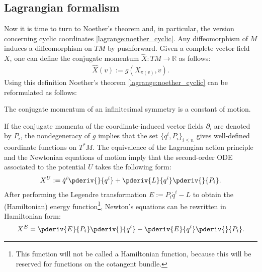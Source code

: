 \subsection{Lagrangian formalism}

    Now it is time to turn to Noether's theorem and, in particular, the version concerning cyclic coordinates \ref{lagrange:noether_cyclic}. Any diffeomorphism of $M$ induces a diffeomorphism on $TM$ by pushforward.
    Given a complete vector field $X$, one can define the conjugate momentum $\widehat{X}:TM\rightarrow\mathbb{R}$ as follows:
    \begin{gather}
        \label{lagrange:metric_conjugate_momentum}
        \widehat{X}(v) := g(X_{\pi(v)},v).
    \end{gather}
    Using this definition Noether's theorem \ref{lagrange:noether_cyclic} can be reformulated as follows:
    \begin{theorem}
        The conjugate momentum of an infinitesimal symmetry is a constant of motion.
    \end{theorem}

    If the conjugate momenta of the coordinate-induced vector fields $\partial_i$ are denoted by $P_i$, the nondegeneracy of $g$ implies that the set $\{q^i,P_i\}_{i\leq n}$ gives well-defined coordinate functions on $T^*M$. The equivalence of the Lagrangian action principle and the Newtonian equations of motion imply that the second-order ODE associated to the potential $U$ takes the following form:
    \begin{gather}
        X^U := \dot{q}^i\pderiv{}{q^i} + \pderiv{L}{q^i}\pderiv{}{P_i}.
    \end{gather}
    After performing the Legendre transformation $E:=P_i\dot{q}^i-L$ to obtain the (Hamiltonian) energy function\footnote{This function will not be called a Hamiltonian function, because this will be reserved for functions on the cotangent bundle.}, Newton's equations can be rewritten in Hamiltonian form:
    \begin{gather}
        X^E = \pderiv{E}{P_i}\pderiv{}{q^i}-\pderiv{E}{q^i}\pderiv{}{P_i}.
    \end{gather}

